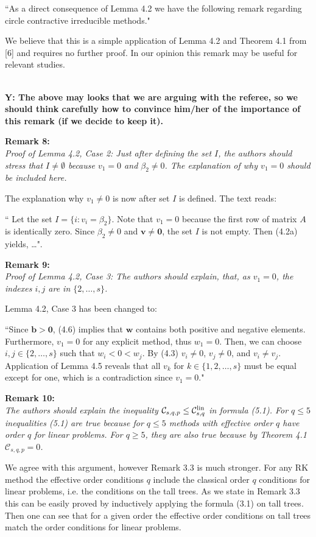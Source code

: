 \documentclass[12pt]{article}
\newcommand{\remark}[2]{\vspace{25pt} \noindent \textbf{Remark #1:\newline} \textit{#2}\vspace{15pt}}
\renewcommand{\newline}{\vspace{15pt}\\}
\newcommand{\sspcoef}{\mathcal{C}}
\newcommand{\clin}{\sspcoef^{\textnormal{lin}}_{s,q}}
\newcommand{\yiannis}[1]{\textcolor{OliveGreen}{\\\textbf{Y: \footnotesize #1}\\}}
\begin{document}
``As a direct consequence of Lemma 4.2 we have the following 
remark regarding circle contractive irreducible methods."

We believe that this is a simple application of Lemma 4.2 and Theorem 4.1
from [6] and requires no further proof. In our opinion this remark may be useful for
relevant studies.

\yiannis{The above may looks that we are arguing with the referee, so we should think 
carefully how to convince him/her of the importance of this remark (if we decide to keep it). }

\remark{8}{
Proof of Lemma 4.2, Case 2: Just after defining the set $I$, the authors should stress that
$I \neq \emptyset$ because $v_1 = 0$ and $\beta_2 \neq 0$.
The explanation of why $v_1 = 0$ should be included
here.}

The explanation why $v_1 \neq 0$ is now after set $I$ is defined. The text reads:

``	Let the set $I = \{i : v_i = \beta_2\}$. 
Note that $v_1 = 0$ because the first row of matrix $A$ is identically zero.
Since $\beta_2 \neq 0$ and $ \bm{v} \neq \bm{0}$, the set $I$ is not empty.
Then (4.2a) yields, \dots".
	
\remark{9}{
Proof of Lemma 4.2, Case 3: The authors should explain, that, as $v_1 = 0$, the 
indexes $i,j$ are in $\{2,\dots,s\}$.}

Lemma 4.2, Case 3 has been changed to:

``Since $\bm{b} > \bm{0}$, (4.6) implies that $\bm{w}$ contains both positive 
and negative elements. 
Furthermore, $v_1=0$ for any explicit method, thus $w_1=0$.
Then, we can choose $i, j \in \{2, \dots, s\}$ such that $w_i < 0 < w_j$.
By (4.3) $v_i\ne 0$, $v_j\ne 0$, and $v_i\ne v_j$.
Application of Lemma 4.5 reveals that all $v_k$ for 
$k \in\{1,2,\dots,s\}$ must be equal except for one, which is a contradiction
since $v_1 = 0$."

\remark{10}{
The authors should explain the inequality $\sspcoef_{s,q,p} \leq \clin$ in formula (5.1). 
For $q \leq 5$ inequalities (5.1) are true because for $q \leq 5$ methods with effective 
order $q$ have order $q$ for linear problems. 
For $q \geq 5$, they are also true because by Theorem 4.1 $\sspcoef_{s,q,p}  = 0$.}

We agree with this argument, however Remark 3.3 is much stronger. 
For any RK method the effective order conditions $q$ include the classical order $q$ 
conditions for linear problems, i.e. the conditions on the tall trees. 
As we state in Remark 3.3 this can be easily proved by inductively applying the formula 
(3.1) on tall trees. 
Then one can see that for a given order the effective order conditions on tall trees 
match the order conditions for linear problems.
\end{document}

